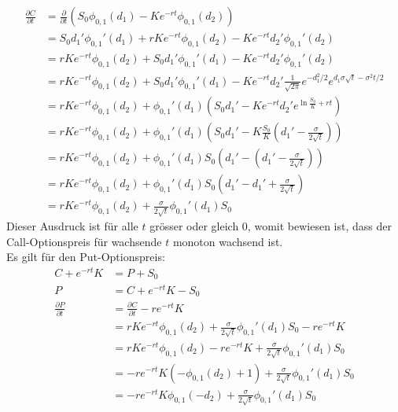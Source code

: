 \documentclass[11pt]{report} %
\newcommand\pd[2]{\displaystyle\frac{\partial #1}{\partial #2}}
\begin{document}
    \begin{align*}
    \pd{C}{t}&=\frac{\partial}{\partial t}\left(S_0\phi_{0, 1}(d_1)-Ke^{-rt}\phi_{0, 1}(d_2)\right)\\
    &=S_0d_1'\phi_{0, 1}'(d_1)+rKe^{-rt}\phi_{0, 1}(d_2)-Ke^{-rt}d_2'\phi_{0, 1}'(d_2)\\
    &=rKe^{-rt}\phi_{0, 1}(d_2)+S_0d_1'\phi_{0, 1}'(d_1)-Ke^{-rt}d_2'\phi_{0, 1}'(d_2)\\
    &=rKe^{-rt}\phi_{0, 1}(d_2)+S_0d_1'\phi_{0, 1}'(d_1)-Ke^{-rt}d_2'\frac{1}{\sqrt{2\pi}}e^{-d_1^2/2}e^{d_1\sigma\sqrt{t}-\sigma^2t/2}\\
    &=rKe^{-rt}\phi_{0, 1}(d_2)+\phi_{0, 1}'(d_1)\left(S_0d_1'-Ke^{-rt}d_2'e^{\ln{\frac{S_0}{K}}+rt}\right)\\
    &=rKe^{-rt}\phi_{0, 1}(d_2)+\phi_{0, 1}'(d_1)\left(S_0d_1'-K\frac{S_0}{K}(d_1'-\frac{\sigma}{2\sqrt{t}})\right)\\
    &=rKe^{-rt}\phi_{0, 1}(d_2)+\phi_{0, 1}'(d_1)S_0\left(d_1'-(d_1'-\frac{\sigma}{2\sqrt{t}})\right)\\
    &=rKe^{-rt}\phi_{0, 1}(d_2)+\phi_{0, 1}'(d_1)S_0\left(d_1'-d_1'+\frac{\sigma}{2\sqrt{t}}\right)\\
    &=rKe^{-rt}\phi_{0, 1}(d_2)+\frac{\sigma}{2\sqrt{t}}\phi_{0, 1}'(d_1)S_0
\end{align*}
Dieser Ausdruck ist für alle $t$ grösser oder gleich 0, womit bewiesen ist, dass der Call-Optionspreis für wachsende $t$ monoton wachsend ist. \\Es gilt für den Put-Optionspreis:
    \begin{align*}
    C+e^{-rt}K&=P+S_0\\
    P&=C+e^{-rt}K-S_0\\
    \pd{P}{t}&=\pd{C}{t}-re^{-rt}K\\
    &=rKe^{-rt}\phi_{0, 1}(d_2)+\frac{\sigma}{2\sqrt{t}}\phi_{0, 1}'(d_1)S_0-re^{-rt}K\\
    &=rKe^{-rt}\phi_{0, 1}(d_2)-re^{-rt}K+\frac{\sigma}{2\sqrt{t}}\phi_{0, 1}'(d_1)S_0\\
    &=-re^{-rt}K(-\phi_{0, 1}(d_2)+1)+\frac{\sigma}{2\sqrt{t}}\phi_{0, 1}'(d_1)S_0\\
    &=-re^{-rt}K\phi_{0, 1}(-d_2)+\frac{\sigma}{2\sqrt{t}}\phi_{0, 1}'(d_1)S_0
\end{align*}
\end{document}
